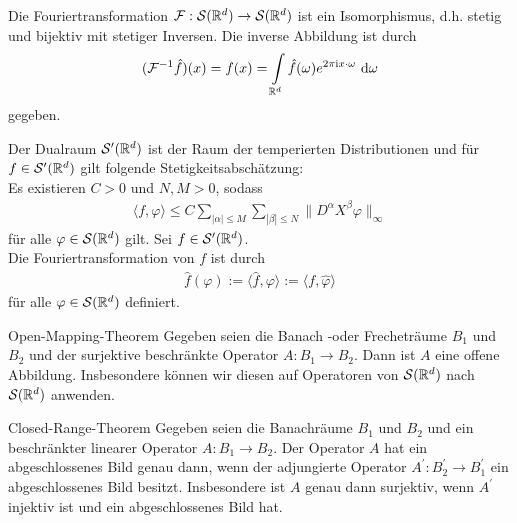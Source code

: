 \newpage 
\begin{sz}
	Die Fouriertransformation $ \mathcal{F} : \mathcal{S}(\mathbb{R}^d) \to \mathcal{S}(\mathbb{R}^d)  $ ist ein Isomorphismus, d.h. stetig und bijektiv mit stetiger Inversen.
	Die inverse Abbildung ist durch
	\begin{align}\label{eq:fouriertransformation_inverse}
	(\mathcal{F}^{-1} \hat{f} )(x) = f(x) 
	=
	\int \limits_{\mathbb{R}^d} \hat{f}(\omega)e^{2\pi \textrm{i} x \cdot \omega} \text{ d} \omega
	\end{align}
	gegeben.
\end{sz}
Der Dualraum $ \mathcal{S}^\prime(\mathbb{R}^d) $ ist der Raum der temperierten Distributionen und für $ f \in \mathcal{S}^\prime(\mathbb{R}^d) $ gilt folgende Stetigkeitsabschätzung:\\
Es existieren $ C >0  $ und $ N,M > 0  $, sodass
\begin{align}\label{eq:cont_distribution}
\langle f, \varphi \rangle 
\leq
C 
\sum \limits_{|\alpha| \leq M}
\sum \limits_{|\beta| \leq N}
\| D^\alpha X^\beta \varphi \|_\infty
\end{align}
für alle $ \varphi \in \mathcal{S}(\mathbb{R}^d) $ gilt. Sei $ f \in \mathcal{S}^\prime(\mathbb{R}^d) $.\\ Die Fouriertransformation von $ f $  ist durch
\begin{align}
\hat{f} (\varphi ) := \langle \hat{f}, \varphi \rangle := \langle f , \hat{\varphi} \rangle
\end{align}
für alle $ \varphi \in \mathcal{S}(\mathbb{R}^d) $ definiert. 

\begin{genericthm}{Open-Mapping-Theorem}\label{th:open_mapping}
	Gegeben seien die Banach -oder Frecheträume  $ B_1 $ und $ B_2 $ und der surjektive beschränkte Operator $ A : B_1  \to B_2 $.
	Dann ist $ A $ eine offene Abbildung.
	Insbesondere können wir diesen auf Operatoren von $ \mathcal{S}(\mathbb{R}^d)  $ nach $ \mathcal{S}(\mathbb{R}^d) $ anwenden.
\end{genericthm}

\begin{genericthm}{Closed-Range-Theorem}\label{th:closed_range}
	Gegeben seien die Banachräume $ B_1 $ und $ B_2 $
	und ein beschränkter linearer Operator $ A : B_1 \to B_2 $.
	Der Operator $ A $ hat ein abgeschlossenes Bild genau dann, wenn der 
	adjungierte Operator $ A^\prime : B_2^\prime \to B_1^\prime $
	ein abgeschlossenes Bild besitzt.
	Insbesondere ist $ A $ genau dann surjektiv, wenn $ A^\prime $ injektiv ist und ein abgeschlossenes Bild hat.
\end{genericthm}
